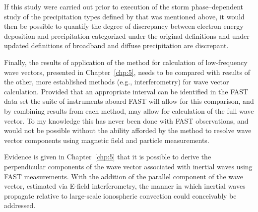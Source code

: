   If this study were carried out prior to execution of the storm
  phase--dependent study of the precipitation types defined by
  \citet{Newell2009}that was mentioned above, it would then be
  possible to quantify the degree of discrepancy between electron
  energy deposition and precipitation categorized under the original
  \citet{Newell2009} definitions and under updated definitions of
  broadband and diffuse precipitation are discrepant.

  Finally, the results of application of the \citet{Bellan2016} method
  for calculation of low-frequency wave vectors, presented in
  Chapter~\ref{chp:5}, needs to be compared with results of the other,
  more established methods (e.g., interferometry) for wave vector
  calculation. Provided that an appropriate interval can be identified
  in the FAST data set the suite of instruments aboard FAST will allow
  for this comparison, and by combining results from each method, may
  allow for calculation of the full wave vector. To my knowledge this
  has never been done with FAST observations, and would not be
  possible without the ability afforded by the \citet{Bellan2016}
  method to resolve wave vector components using magnetic field and
  particle measurements.
  
  Evidence is given in Chapter~\ref{chp:5} that it is possible to
  derive the perpendicular components of the wave vector associated
  with inertial \Alf waves using FAST measurements. With the addition
  of the parallel component of the wave vector, estimated via E-field
  interferometry, the manner in which inertial \Alf waves propagate
  relative to large-scale ionospheric convection could conceivably be
  addressed.

  
  
